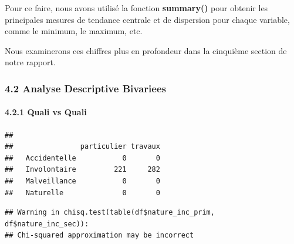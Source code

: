 \documentclass[
]{article}
\newenvironment{Shaded}{\begin{snugshade}}{\end{snugshade}}
\newcommand{\CommentTok}[1]{\textcolor[rgb]{0.56,0.35,0.01}{\textit{#1}}}
\newcommand{\FunctionTok}[1]{\textcolor[rgb]{0.13,0.29,0.53}{\textbf{#1}}}
\newcommand{\NormalTok}[1]{#1}
\newcommand{\OtherTok}[1]{\textcolor[rgb]{0.56,0.35,0.01}{#1}}
\newcommand{\SpecialCharTok}[1]{\textcolor[rgb]{0.81,0.36,0.00}{\textbf{#1}}}
\newcommand{\StringTok}[1]{\textcolor[rgb]{0.31,0.60,0.02}{#1}}
\begin{document}
Pour ce faire, nous avons utilisé la fonction \textbf{summary()} pour
obtenir les principales mesures de tendance centrale et de dispersion
pour chaque variable, comme le minimum, le maximum, etc.

Nous examinerons ces chiffres plus en profondeur dans la cinquième
section de notre rapport.

\subsubsection{4.2 Analyse Descriptive
Bivariees}\label{analyse-descriptive-bivariees}

\paragraph{4.2.1 Quali vs Quali}\label{quali-vs-quali}

\begin{Shaded}
\end{Shaded}

\begin{verbatim}
##               
##                particulier travaux
##   Accidentelle           0       0
##   Involontaire         221     282
##   Malveillance           0       0
##   Naturelle              0       0
\end{verbatim}

\begin{Shaded}
\end{Shaded}

\begin{verbatim}
## Warning in chisq.test(table(df$nature_inc_prim, df$nature_inc_sec)):
## Chi-squared approximation may be incorrect
\end{verbatim}
\end{document}
